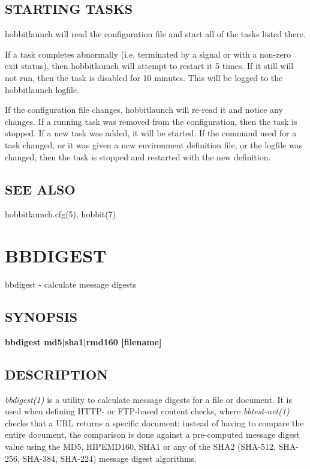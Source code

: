 \subsection{STARTING TASKS}  hobbitlaunch will read the configuration
 file and start all of the tasks listed there. 


  If a task completes abnormally (i.e. terminated by a signal or with
  a non-zero exit status), then hobbitlaunch will attempt to restart
  it 5 times. If it still will not run, then the task is disabled for
  10 minutes. This will be logged to the hobbitlaunch logfile. 


  If the configuration file changes, hobbitlaunch will re-read it and
  notice any changes. If a running task was removed from the
  configuration, then the task is stopped. If a new task was added, it
  will be started. If the command used for a task changed, or it was
  given a new environment definition file, or the logfile was changed,
  then the task is stopped and restarted with the new definition. 



 
\subsection{SEE ALSO}
hobbitlaunch.cfg(5), hobbit(7) 

 


%
%
\newpage
\section{BBDIGEST}
 bbdigest - calculate message digests

\subsection{SYNOPSIS}
\textbf{bbdigest md5|sha1|rmd160 [filename]}


 
\subsection{DESCRIPTION}
\emph{bbdigest(1)}
 is a utility to calculate message digests for a file or document. It
 is used when defining HTTP- or FTP-based content checks, where
 \emph{bbtest-net(1)} checks that a URL returns a specific document;
 instead of having to compare the entire document, the comparison is
 done against a pre-computed message digest value using the MD5,
 RIPEMD160, SHA1 or any of the SHA2 (SHA-512, SHA-256, SHA-384,
 SHA-224) message digest algorithms. 


